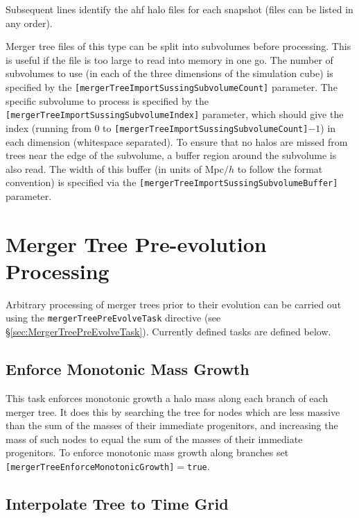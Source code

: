 Subsequent lines identify the \gls{ahf} halo files for each snapshot (files can be listed in any order).

Merger tree files of this type can be split into subvolumes before processing. This is useful if the file is too large to read into memory in one go. The number of subvolumes to use (in each of the three dimensions of the simulation cube) is specified by the {\tt [mergerTreeImportSussingSubvolumeCount]} parameter. The specific subvolume to process is specified by the {\tt [mergerTreeImportSussingSubvolumeIndex]} parameter, which should give the index (running from $0$ to {\tt [mergerTreeImportSussingSubvolumeCount]}$-1$) in each dimension (whitespace separated). To ensure that no halos are missed from trees near the edge of the subvolume, a buffer region around the subvolume is also read. The width of this buffer (in units of Mpc$/h$ to follow the format convention) is specified via the {\tt [mergerTreeImportSussingSubvolumeBuffer]} parameter. 

\section{Merger Tree Pre-evolution Processing}

Arbitrary processing of merger trees prior to their evolution can be carried out using the {\tt mergerTreePreEvolveTask} directive (see \S\ref{sec:MergerTreePreEvolveTask}). Currently defined tasks are defined below.

\subsection{Enforce Monotonic Mass Growth}

This task enforces monotonic growth a halo mass along each branch of each merger tree. It does this by searching the tree for nodes which are less massive than the sum of the masses of their immediate progenitors, and increasing the mass of such nodes to equal the sum of the masses of their immediate progenitors. To enforce monotonic mass growth along branches set {\tt [mergerTreeEnforceMonotonicGrowth]}$=${\tt true}.

\subsection{Interpolate Tree to Time Grid}\label{sec:MergerTreeTimeRegrid}

